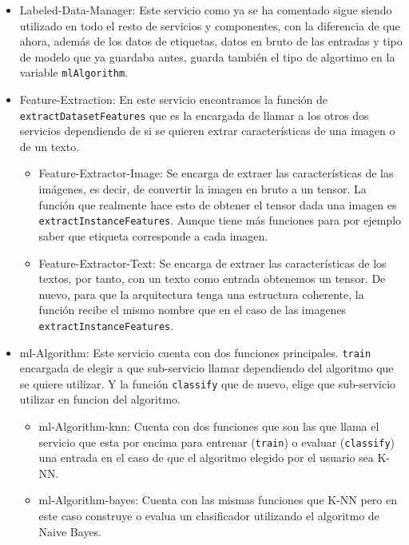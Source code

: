 \documentclass[a4paper, 12pt]{book}
\begin{document}
\begin{itemize}
  
	\item Labeled-Data-Manager: Este servicio como ya se ha comentado sigue siendo utilizado en todo el resto de servicios y componentes, con la diferencia de que ahora, además de los datos de etiquetas, datos en bruto de las entradas y tipo de modelo que ya guardaba antes, guarda también el tipo de algortimo en la variable \texttt{mlAlgorithm}.
 
	\item Feature-Extraction: En este servicio encontramos la función de \texttt{extractDatasetFeatures} que es la encargada de llamar a los otros dos servicios dependiendo de si se quieren extrar características de una imagen o de un texto.
\begin{itemize}
  
	\item Feature-Extractor-Image: Se encarga de extraer las características de las imágenes, es decir, de convertir la imagen en bruto a un tensor. La función que realmente hace esto de obtener el tensor dada una imagen es \texttt{extractInstanceFeatures}. Aunque tiene más funciones para por ejemplo saber que etiqueta corresponde a cada imagen.

	\item Feature-Extractor-Text: Se encarga de extraer las características de los textos, por tanto, con un texto como entrada obtenemos un tensor. De nuevo, para que la arquitectura tenga una estructura coherente, la función recibe el mismo nombre que en el caso de las imagenes \texttt{extractInstanceFeatures}. 
\end{itemize}

	\item ml-Algorithm: Este servicio cuenta con dos funciones principales. \texttt{train} encargada de elegir a que sub-servicio llamar dependiendo del algoritmo que se quiere utilizar. Y la función \texttt{classify} que de nuevo, elige que sub-servicio utilizar en funcion del algoritmo.
\begin{itemize}
  
	\item ml-Algorithm-knn: Cuenta con dos funciones que son las que llama el servicio que esta por encima para entrenar (\texttt{train}) o evaluar  (\texttt{classify}) una entrada en el caso de que el algoritmo elegido por el usuario sea K-NN.

	\item ml-Algorithm-bayes: Cuenta con las mismas funciones que K-NN pero en este caso construye o evalua un clasificador utilizando el algoritmo de Naive Bayes.
\end{itemize}


\end{itemize}
\end{document}
